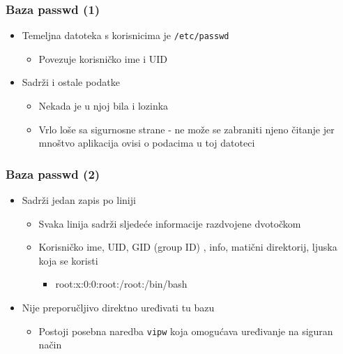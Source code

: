 \documentclass[table,usenames,dvipsnames] {beamer}
\newcommand{\shell}[1]{\texttt{#1}}
\begin{document}
\begin{frame}[t]
\frametitle{Baza passwd (1)} 
\begin{itemize}
  \item Temeljna datoteka s korisnicima je \shell{/etc/passwd}
  \begin{itemize} 
    \item Povezuje korisničko ime i UID
  \end{itemize}
  \item Sadrži i ostale podatke
  \begin{itemize}
    \item Nekada je u njoj bila i lozinka
    \item Vrlo loše sa sigurnosne strane - ne može se zabraniti njeno čitanje jer mnoštvo aplikacija ovisi 
          o podacima u toj datoteci
  \end{itemize}
\end{itemize}
\end{frame}

\begin{frame}[t]
\frametitle{Baza passwd (2)} 
\begin{itemize}
  \item Sadrži jedan zapis po liniji
  \begin{itemize}
    \item Svaka linija sadrži sljedeće informacije razdvojene dvotočkom
    \item Korisničko ime, UID, GID (group ID) , info, matični direktorij,
          ljuska koja se koristi
    \begin{itemize}
      \item[] root:x:0:0:root:/root:/bin/bash
    \end{itemize}
  \end{itemize}
  \item Nije preporučljivo direktno uređivati tu bazu
  \begin{itemize}
    \item Postoji posebna naredba \shell{vipw} koja omogućava uređivanje na
          siguran način
  \end{itemize}
\end{itemize}
\end{frame}
    
\end{document}
